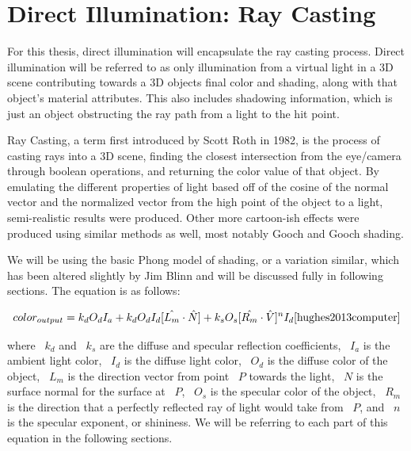 \section{Direct Illumination: Ray Casting}
\label{sec:RayCasting}
For this thesis, direct illumination will encapsulate the ray casting process. Direct illumination will be referred to as only illumination from a virtual light in a 3D scene contributing towards a 3D objects final color and shading, along with that object's material attributes.  This also includes shadowing information, which is just an object obstructing the ray path from a light to the hit point.

Ray Casting, a term first introduced by Scott Roth in 1982, is the process of casting rays into a 3D scene, finding the closest intersection from the eye/camera through boolean operations, and returning the color value of that object\cite{Roth1982}.  By emulating the different properties of light based off of the cosine of the normal vector and the normalized vector from the high point of the object to a light, semi-realistic results were produced.  Other more cartoon-ish effects were produced using similar methods as well, most notably Gooch and Gooch shading.

We will be using the basic Phong model of shading, or a variation similar, which has been altered slightly by Jim Blinn and will be discussed fully in following sections.  The equation is as follows:

\begin{equation}
\label{eq:phongModel}
color_{output} = k_{d}O_{d}I_{a} + k_{d}O_{d}I_{d}[\hat{L_{m}} \cdot \hat{N}] + k_{s}O_{s}[\hat{R_{m}} \cdot \hat{V}]^{n}I_{d} \cite{hughes2013computer}
\end{equation}

where ~$k_{d}$ and ~$k_{s}$ are the diffuse and specular reflection coefficients, ~$I_{a}$ is the ambient light color, ~$I_{d}$ is the diffuse light color, ~$O_{d}$ is the diffuse color of the object, ~$L_m$ is the direction vector from point ~$P$ towards the light, ~$N$ is the surface normal for the surface at ~$P$, ~$O_{s}$ is the specular color of the object, ~$R_m$ is the direction that a perfectly reflected ray of light would take from ~$P$, and ~$n$ is the specular exponent, or shininess.  We will be referring to each part of this equation in the following sections.

